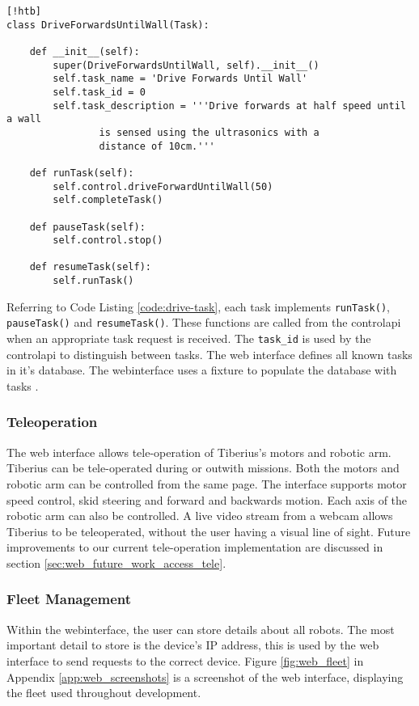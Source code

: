 \begin{lstlisting}[style=custompython,label=code:drive-task][!htb]
class DriveForwardsUntilWall(Task):

    def __init__(self):
        super(DriveForwardsUntilWall, self).__init__()
        self.task_name = 'Drive Forwards Until Wall'
        self.task_id = 0
        self.task_description = '''Drive forwards at half speed until a wall
				is sensed using the ultrasonics with a
				distance of 10cm.'''

    def runTask(self):
        self.control.driveForwardUntilWall(50)
        self.completeTask()

    def pauseTask(self):
        self.control.stop()

    def resumeTask(self):
        self.runTask()
\end{lstlisting}
\noindent
Referring to Code Listing \ref{code:drive-task}, each task implements \texttt{runTask()}, \texttt{pauseTask()} and \texttt{resumeTask()}. These functions are called from the \gls{controlapi} when an appropriate task request is received. The \texttt{task\_id} is used by the \gls{controlapi} to distinguish between tasks. The web interface defines all known tasks in it's database. The \gls{webinterface} uses a fixture to populate the database with tasks \cite{github-fixtures}.


\subsubsection{Teleoperation}

The web interface allows tele-operation of Tiberius's motors and robotic arm. Tiberius can be tele-operated during or outwith missions. Both the motors and robotic arm can be controlled from the same page. The interface supports motor speed control, skid steering and forward and backwards motion. Each axis of the robotic arm can also be controlled. A live video stream from a webcam allows Tiberius to be teleoperated, without the user having a visual line of sight.
\newline
Future improvements to our current tele-operation implementation are discussed in section \ref{sec:web_future_work_access_tele}.


\subsubsection{Fleet Management}
Within the \gls{webinterface}, the user can store details about all robots. The most important detail to store is the device's IP address, this is used by the web interface to send requests to the correct device. Figure \ref{fig:web_fleet} in Appendix \ref{app:web_screenshots} is a screenshot of the web interface, displaying the fleet used throughout development.